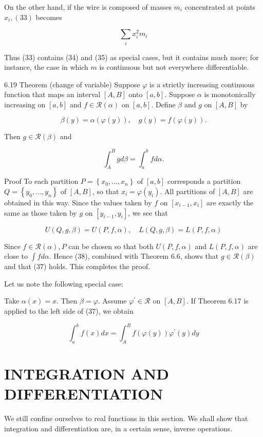 \documentclass[10pt]{article}
\begin{document}
On the other hand, if the wire is composed of masses $m_{i}$ concentrated at points $x_{i},(33)$ becomes

$$
\sum_{i} x_{i}^{2} m_{i}
$$

Thus (33) contains (34) and (35) as special cases, but it contains much more; for instance, the case in which $m$ is continuous but not everywhere differentiable.

6.19 Theorem (change of variable) Suppose $\varphi$ is a strictly increasing continuous function that maps an interval $[A, B]$ onto $[a, b]$. Suppose $\alpha$ is monotonically increasing on $[a, b]$ and $f \in \mathscr{R}(\alpha)$ on $[a, b]$. Define $\beta$ and $g$ on $[A, B]$ by

$$
\beta(y)=\alpha(\varphi(y)), \quad g(y)=f(\varphi(y)) .
$$

Then $g \in \mathscr{R}(\beta)$ and

$$
\int_{A}^{B} g d \beta=\int_{a}^{b} f d \alpha .
$$

Proof To each partition $P=\left\{x_{0}, \ldots, x_{n}\right\}$ of $[a, b]$ corresponds a partition $Q=\left\{y_{0}, \ldots, y_{n}\right\}$ of $[A, B]$, so that $x_{i}=\varphi\left(y_{i}\right)$. All partitions of $[A, B]$ are obtained in this way. Since the values taken by $f$ on $\left[x_{i-1}, x_{i}\right]$ are exactly the same as those taken by $g$ on $\left[y_{i-1}, y_{i}\right]$, we see that

$$
U(Q, g, \beta)=U(P, f, \alpha), \quad L(Q, g, \beta)=L(P, f, \alpha)
$$

Since $f \in \mathscr{R}(\alpha), P$ can be chosen so that both $U(P, f, \alpha)$ and $L(P, f, \alpha)$ are close to $\int f d \alpha$. Hence (38), combined with Theorem 6.6, shows that $g \in \mathscr{R}(\beta)$ and that (37) holds. This completes the proof.

Let us note the following special case:

Take $\alpha(x)=x$. Then $\beta=\varphi$. Assume $\varphi^{\prime} \in \mathscr{R}$ on $[A, B]$. If Theorem 6.17 is applied to the left side of (37), we obtain

$$
\int_{a}^{b} f(x) d x=\int_{A}^{B} f(\varphi(y)) \varphi^{\prime}(y) d y
$$

\section{INTEGRATION AND DIFFERENTIATION}
We still confine ourselves to real functions in this section. We shall show that integration and differentiation are, in a certain sense, inverse operations.
\end{document}
